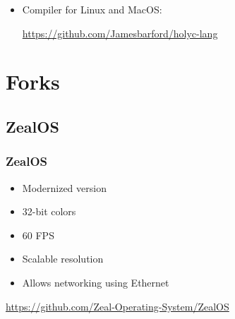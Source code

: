 \documentclass{beamer}
\begin{document}
{\begin{frame}
\begin{itemize}
				\url{https://holyc-lang.com/}

			\item Compiler for Linux and MacOS:

				\url{https://github.com/Jamesbarford/holyc-lang}
		\end{itemize}
	\end{frame}

	\section{Forks}
	\subsection{ZealOS}
	\begin{frame}
		\frametitle{ZealOS}
		\begin{itemize}
			\item Modernized version

			\item 32-bit colors

			\item 60 FPS

			\item Scalable resolution

			\item Allows networking using Ethernet
		\end{itemize}
		\url{https://github.com/Zeal-Operating-System/ZealOS}
	\end{frame}

}
\end{document}
